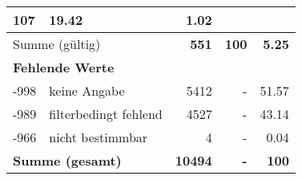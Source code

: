 \begin{longtable}{lXrrr}
       \num{107} &
       \num[round-mode=places,round-precision=2]{19,42} &
         \num[round-mode=places,round-precision=2]{1,02} \\
     \midrule
     \multicolumn{2}{l}{Summe (gültig)} &
       \textbf{\num{551}} &
     \textbf{100} &
       \textbf{\num[round-mode=places,round-precision=2]{5,25}} \\
     \multicolumn{5}{l}{\textbf{Fehlende Werte}}\\
       -998 &
       keine Angabe &
         \num{5412} &
        - &
         \num[round-mode=places,round-precision=2]{51,57} \\
       -989 &
       filterbedingt fehlend &
         \num{4527} &
        - &
         \num[round-mode=places,round-precision=2]{43,14} \\
       -966 &
       nicht bestimmbar &
         \num{4} &
        - &
         \num[round-mode=places,round-precision=2]{0,04} \\
     \midrule
     \multicolumn{2}{l}{\textbf{Summe (gesamt)}} &
          \textbf{\num{10494}} &
        \textbf{-} &
        \textbf{100} \\
     \bottomrule
     \end{longtable}
     
